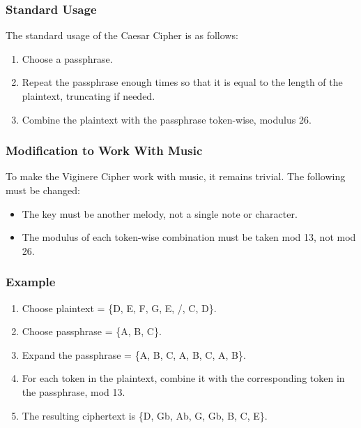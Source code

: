 \documentclass[14pt]{article}
\begin{document}
            \subsubsection{Standard Usage}
            The standard usage of the Caesar Cipher is as follows:
            \begin{enumerate}
                \item Choose a passphrase.
                \item Repeat the passphrase enough times so that it is equal to the length of the plaintext, truncating if needed.
                \item Combine the plaintext with the passphrase token-wise, modulus 26.
            \end{enumerate}
            \cite{Trappe}

            \subsubsection{Modification to Work With Music}
            To make the Viginere Cipher work with music, it remains trivial. The following must be changed:
            \begin{itemize}
                \item The key must be another melody, not a single note or character.
                \item The modulus of each token-wise combination must be taken mod 13, not mod 26.
            \end{itemize}

            \subsubsection{Example}
            \begin{enumerate}
                \item Choose plaintext = \{D, E, F, G, E, /, C, D\}.
                \item Choose passphrase = \{A, B, C\}.
                \item Expand the passphrase = \{A, B, C, A, B, C, A, B\}.
                \item For each token in the plaintext, combine it with the corresponding token in the passphrase, mod 13.
                \item The resulting ciphertext is \{D, Gb, Ab, G, Gb, B, C, E\}.
                
            \end{enumerate}
    
\end{document}
